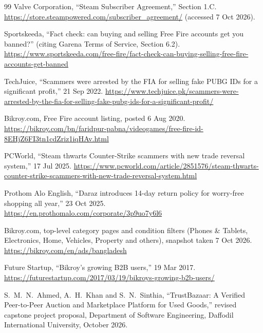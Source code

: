 \documentclass[11pt,a4paper]{article}
\begin{document}
\begin{thebibliography}{99}
 Valve Corporation, ``Steam Subscriber Agreement,'' Section 1.C.
\url{https://store.steampowered.com/subscriber_agreement/} (accessed 7 Oct 2026).

 Sportskeeda, ``Fact check: can buying and selling Free Fire accounts get you
banned?'' (citing Garena Terms of Service, Section 6.2).
\url{https://www.sportskeeda.com/free-fire/fact-check-can-buying-selling-free-fire-accounts-get-banned}

 TechJuice, ``Scammers were arrested by the FIA for selling fake PUBG IDs
for a significant profit,'' 21 Sep 2022.
\url{https://www.techjuice.pk/scammers-were-arrested-by-the-fia-for-selling-fake-pubg-ids-for-a-significant-profit/}

 Bikroy.com, Free Fire account listing, posted 6 Aug 2020.
\url{https://bikroy.com/bn/faridpur-pabna/videogames/free-fire-id-8EHjZ6FI3tn1cdZriz1iqHAv.html}

 PCWorld, ``Steam thwarts Counter-Strike scammers with new trade reversal
system,'' 17 Jul 2025.
\url{https://www.pcworld.com/article/2851576/steam-thwarts-counter-strike-scammers-with-new-trade-reversal-system.html}

 Prothom Alo English, ``Daraz introduces 14-day return policy for worry-free
shopping all year,'' 23 Oct 2025. \url{https://en.prothomalo.com/corporate/3p9uo7y6l6}

 Bikroy.com, top-level category pages and condition filters (Phones \&
Tablets, Electronics, Home, Vehicles, Property and others), snapshot taken 7 Oct 2026.
\url{https://bikroy.com/en/ads/bangladesh}

 Future Startup, ``Bikroy's growing B2B users,'' 19 Mar 2017.
\url{https://futurestartup.com/2017/03/19/bikroys-growing-b2b-users/}

 S.~M.~N.~Ahmed, A.~H.~Khan and S.~N.~Sinthia, ``TrustBazaar: A Verified
Peer-to-Peer Auction and Marketplace Platform for Used Goods,'' revised capstone project
proposal, Department of Software Engineering, Daffodil International University, October 2026.

\end{thebibliography}
\end{document}
